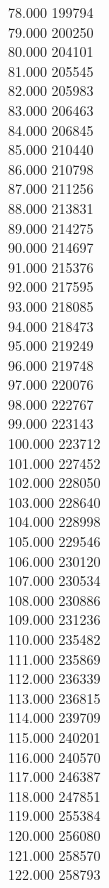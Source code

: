 { 78.000	199794 \\
 79.000	200250 \\
 80.000	204101 \\
 81.000	205545 \\
 82.000	205983 \\
 83.000	206463 \\
 84.000	206845 \\
 85.000	210440 \\
 86.000	210798 \\
 87.000	211256 \\
 88.000	213831 \\
 89.000	214275 \\
 90.000	214697 \\
 91.000	215376 \\
 92.000	217595 \\
 93.000	218085 \\
 94.000	218473 \\
 95.000	219249 \\
 96.000	219748 \\
 97.000	220076 \\
 98.000	222767 \\
 99.000	223143 \\
 100.000	223712 \\
 101.000	227452 \\
 102.000	228050 \\
 103.000	228640 \\
 104.000	228998 \\
 105.000	229546 \\
 106.000	230120 \\
 107.000	230534 \\
 108.000	230886 \\
 109.000	231236 \\
 110.000	235482 \\
 111.000	235869 \\
 112.000	236339 \\
 113.000	236815 \\
 114.000	239709 \\
 115.000	240201 \\
 116.000	240570 \\
 117.000	246387 \\
 118.000	247851 \\
 119.000	255384 \\
 120.000	256080 \\
 121.000	258570 \\
 122.000	258793 \\
}
